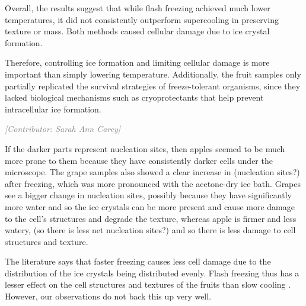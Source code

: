 \documentclass[12pt, a4paper]{article}
\newcommand{\contributor}[1]{\vspace{4pt}\noindent\textcolor{gray}{\small\textit{[Contributor: #1]}}\vspace{2pt}}
\begin{document}
Overall, the results suggest that while flash freezing achieved much
lower temperatures, it did not consistently outperform supercooling in
preserving texture or mass. Both methods caused cellular damage due to
ice crystal formation.


Therefore, controlling ice formation and limiting cellular damage is
more important than simply lowering temperature. Additionally, the fruit
samples only partially replicated the survival strategies of
freeze-tolerant organisms, since they lacked biological mechanisms such
as cryoprotectants that help prevent intracellular ice formation.

\contributor{Sarah Ann Carey}

If the darker parts represent nucleation sites, then apples seemed to be
much more prone to them because they have consistently darker cells
under the microscope. The grape samples also showed a clear increase in
(nucleation sites?) after freezing, which was more pronounced with the
acetone-dry ice bath. Grapes see a bigger change in nucleation sites,
possibly because they have significantly more water and so the ice
crystals can be more present and cause more damage to the cell's
structures and degrade the texture, whereas apple is firmer and less
watery, (so there is less net nucleation sites?) and so there is less
damage to cell structures and texture.


The literature says that faster freezing causes less cell damage due to
the distribution of the ice crystals being distributed evenly.
Flash freezing thus has a lesser effect on the cell structures and
textures of the fruits than slow cooling \cite{narayana2023}. However,
our observations do not back this up very well.
\end{document}
